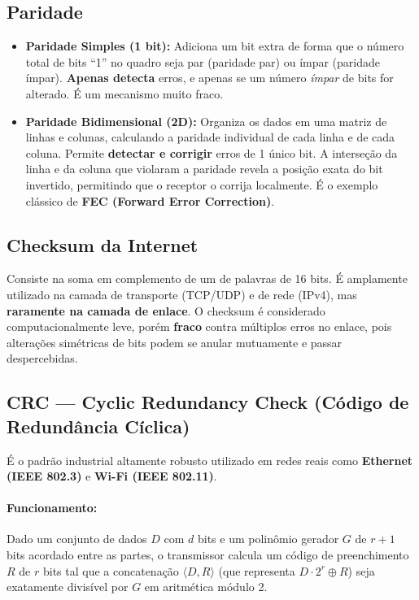 \documentclass[11pt,a4paper]{article}
\begin{document}
\subsection{Paridade}
\begin{itemize}
    \item \textbf{Paridade Simples (1 bit):} Adiciona um bit extra de forma que o número total de bits ``1'' no quadro seja par (paridade par) ou ímpar (paridade ímpar). \textbf{Apenas detecta} erros, e apenas se um número \emph{ímpar} de bits for alterado. É um mecanismo muito fraco.
    \item \textbf{Paridade Bidimensional (2D):} Organiza os dados em uma matriz de linhas e colunas, calculando a paridade individual de cada linha e de cada coluna. Permite \textbf{detectar e corrigir} erros de 1 único bit. A interseção da linha e da coluna que violaram a paridade revela a posição exata do bit invertido, permitindo que o receptor o corrija localmente. É o exemplo clássico de \textbf{FEC (Forward Error Correction)}.
\end{itemize}

\subsection{Checksum da Internet}
Consiste na soma em complemento de um de palavras de 16 bits. É amplamente utilizado na camada de transporte (TCP/UDP) e de rede (IPv4), mas \textbf{raramente na camada de enlace}. O checksum é considerado computacionalmente leve, porém \textbf{fraco} contra múltiplos erros no enlace, pois alterações simétricas de bits podem se anular mutuamente e passar despercebidas.

\subsection{CRC --- Cyclic Redundancy Check (Código de Redundância Cíclica)}
É o padrão industrial altamente robusto utilizado em redes reais como \textbf{Ethernet (IEEE 802.3)} e \textbf{Wi-Fi (IEEE 802.11)}.

\paragraph{Funcionamento:}
Dado um conjunto de dados $D$ com $d$ bits e um polinômio gerador $G$ de $r+1$ bits acordado entre as partes, o transmissor calcula um código de preenchimento $R$ de $r$ bits tal que a concatenação $\langle D, R \rangle$ (que representa $D \cdot 2^r \oplus R$) seja exatamente divisível por $G$ em aritmética módulo 2.
\end{document}
